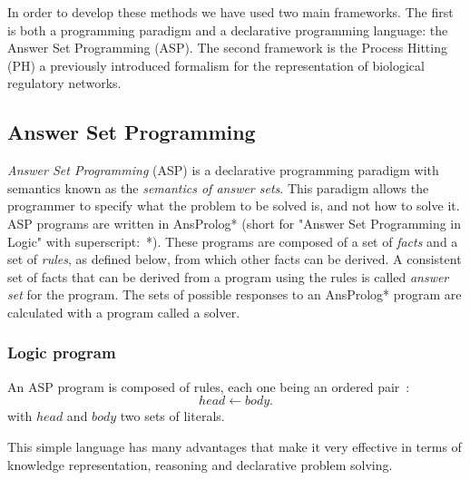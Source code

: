In order to develop these methods we have used two main frameworks. The first is both a programming paradigm and a declarative programming language: the Answer Set Programming (ASP).
The second framework is the Process Hitting (PH) a previously introduced formalism for the representation of biological regulatory networks.

\subsection{Answer Set Programming }

\emph{Answer Set Programming} (ASP) is a declarative programming paradigm with semantics known as the \emph{semantics of answer sets}.
This paradigm allows the programmer to specify what the problem to be solved is, and not how to solve it.
ASP programs are written in AnsProlog* (short for "Answer Set Programming in Logic" with superscript:~*).
These programs are composed of a set of \emph{facts} and a set of \emph{rules}, as defined below, from which other facts can be derived.
A consistent set of facts that can be derived from a program using the rules is called \emph{answer set} for the program.
The sets of possible responses to an AnsProlog* program are calculated with a program called a solver.

\subsubsection{Logic program}
An ASP program is composed of rules, each one being an ordered pair~\cite{baral2003knowledge}:
\begin{equation} \label{eq1ASP}
head \leftarrow body.
\end{equation}
with $head$ and $body$ two sets of literals. 

This simple language has many advantages that make it very effective in terms of knowledge representation, reasoning and declarative problem solving. 

